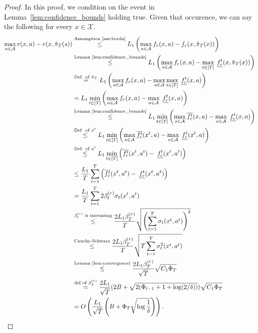 \documentclass{article} \usepackage{iclr2023_conference,times}
\newcommand{\Contextspace}{\mathcal{X}}
\newcommand{\Actionspace}{\mathcal{A}}
\newcommand{\bestpolicy}{\hat{\pi}_T}
\newcommand{\ainset}{a \in \Actionspace}
\newcommand{\lcbr}{\underline{f_r^t}}
\newcommand{\ucbr}{\overline{f_r^t}}
\newcommand{\bonus}{\beta_t^{(r)}}
\newcommand{\lastbonus}{\beta_T^{(r)}}
\newcommand{\xinset}{x \in \Contextspace}
\begin{document}
\begin{proof}
        In this proof, we condition on the event in Lemma~\ref{lem:confidence_bounds} holding true.
        Given that occurence, we can say the following for every $\xinset$.
        \begin{align}
                \max_{\ainset} r(x, a) - r(x, \bestpolicy(s)) & \overset{\text{Assumption \ref{ass:borda}}}{\leq} L_1
                \left(\max_{\ainset} f_r (x, a) - f_r(x,\bestpolicy (x))\right) \\
             & \overset{\text{Lemma~\ref{lem:confidence_bounds}}}{\leq}
                L_1\left(\max_{\ainset} f_r (x, a) -   \max_{t \in [T]}\; \lcbr(x, \bestpolicy(x))\right)  \\
             &\overset{ \text{Def. of } \bestpolicy}  {=}
                 L_1\left(\max_{\ainset} f_r (x, a)  - \max_{\ainset} \max_{t \in [T]}\; \lcbr(x, a)\right) \\
             &=
                 L_1\min_{t \in [T]} \left(\max_{\ainset} f_r (x, a)  - \max_{\ainset} \; \lcbr(x, a)\right) \\
             & \overset{\text{Lemma~\ref{lem:confidence_bounds}}} {\leq}
                 L_1\min_{t \in [T]} \left(\max_{\ainset} \ucbr(x, a) - \max_{\ainset} \; \lcbr(x, a)\right) \\
            & \overset{ \text{Def. of } x^t}{\leq}
                L_1\min_{t\in [T]} \left(\max_{\ainset} \ucbr(x^t, a) - \max_{\ainset} \; \lcbr(x^t, a)\right) \\
            & \overset{\text{Def. of } a^t} {\leq}
                L_1\min_{t \in [T]}\left( \ucbr(x^t, a^t) -  \; \lcbr(x^t, a^t)\right) \\
            & \leq
                \frac{L_1}{T}\sum_{t=1}^T \left( \ucbr(x^t, a^t) -  \; \lcbr(x^t, a^t)\right)\\
            & = \frac{L_1}{T}\sum_{t=1}^T 2\bonus \sigma_t(x^t, a^t)\\
            & \overset{\bonus\text{ is increasing}}{\leq} \frac{2L_1\lastbonus}{T}\sqrt{\left(\sum_{t=1}^T\sigma_t(x^t, a^t)\right)^2}\\
            & \overset{\text{Cauchy-Schwarz}}{\leq}
                \frac{2L_1\lastbonus}{T}\sqrt{T\sum_{t=1}^T\sigma^2_t(x^t, a^t)}\\
            & \overset{\text{Lemma~\ref{lem:convergence}}}{\leq}
                \frac{2L_1\lastbonus}{\sqrt{T}}\sqrt{C_1 \Phi_T}\\
            & \overset{\text{def of }\lastbonus}{=} \frac{2L_1}{\sqrt{T}}(2B + \sqrt{2(\Phi_{t-1} + 1 + \log(2 / \delta))})\sqrt{C_1 \Phi_T}\\
            & = O \left(  \frac{L_1}{\sqrt{T}} \left(B + \Phi_T\sqrt{\log \frac{1}{\delta}} \right)\right).
        \end{align}


\end{proof}
\end{document}
